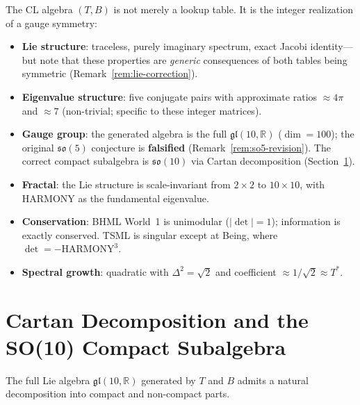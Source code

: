 \documentclass[11pt]{article}
\theoremstyle{definition}
\theoremstyle{remark}
\begin{document}
The CL algebra $(T,B)$ is not merely a lookup table.  It is the integer
realization of a gauge symmetry:
\begin{itemize}
  \item \textbf{Lie structure}: traceless, purely imaginary spectrum, exact
        Jacobi identity---but note that these properties are \emph{generic}
        consequences of both tables being symmetric
        (Remark~\ref{rem:lie-correction}).
  \item \textbf{Eigenvalue structure}: five conjugate pairs with approximate
        ratios $\approx 4\pi$ and $\approx 7$ (non-trivial; specific to these
        integer matrices).
  \item \textbf{Gauge group}: the generated algebra is the full
        $\mathfrak{gl}(10,\mathbb{R})$ ($\dim = 100$); the original
        $\mathfrak{so}(5)$ conjecture is \textbf{falsified}
        (Remark~\ref{rem:so5-revision}).  The correct compact subalgebra is
        $\mathfrak{so}(10)$ via Cartan decomposition
        (Section~\ref{sec:cartan}).
  \item \textbf{Fractal}: the Lie structure is scale-invariant from $2\times 2$
        to $10\times 10$, with HARMONY as the fundamental eigenvalue.
  \item \textbf{Conservation}: BHML World~1 is unimodular ($|\det|=1$);
        information is exactly conserved.  TSML is singular except at Being,
        where $\det = -\text{HARMONY}^3$.
  \item \textbf{Spectral growth}: quadratic with $\Delta^2 = \sqrt{2}$ and
        coefficient $\approx 1/\sqrt{2} \approx T^*$.
\end{itemize}

\section{Cartan Decomposition and the SO(10) Compact Subalgebra}
\label{sec:cartan}

The full Lie algebra $\mathfrak{gl}(10,\mathbb{R})$ generated by $T$ and $B$
admits a natural decomposition into compact and non-compact parts.
\end{document}
